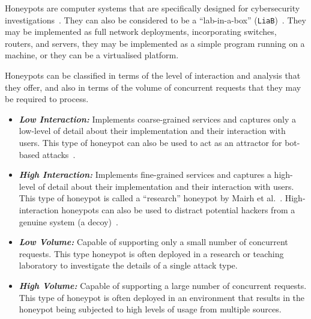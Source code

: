 \documentclass{ieeeaccess}
\begin{document}
Honeypots are computer systems that are specifically designed for cybersecurity
investigations~\cite{FKAS:17,BCF:12}. They can also be considered to be a
``lab-in-a-box'' (\texttt{LiaB})~\cite{CFDMH:09}. They may be implemented as
full network deployments, incorporating switches, routers, and servers, they
may be implemented as a simple program running on a machine, or they can be a
virtualised platform. 

Honeypots can be classified in terms of the level of interaction and
analysis that they offer, and also in terms of the volume of concurrent requests
that they may be required to process.

\begin{itemize}

  \item \noindent \emph{\textbf{Low Interaction:}} Implements coarse-grained
    services and captures only a low-level of detail about their implementation
    and their interaction with users.  This type of honeypot can also be used
    to act as an attractor for bot-based attacks~\cite{SZB:16}.  

  \item \noindent \emph{\textbf{High Interaction:}} Implements fine-grained
    services and captures a high-level of detail about their implementation and
    their interaction with users.  This type of honeypot is called a
    ``research'' honeypot by Mairh et al.~\cite{MBVJ:11}. High-interaction
    honeypots can also be used to distract potential hackers from a genuine
    system (a decoy)~\cite{M:06,SNKA:12}.

\end{itemize}


\begin{itemize}

  \item \noindent \emph{\textbf{Low Volume:}} Capable of supporting only a
    small number of concurrent requests.  This type honeypot is often deployed
    in a research or teaching laboratory to investigate the details of a single
    attack type.

  \item \noindent \emph{\textbf{High Volume:}} Capable of supporting a large
    number of concurrent requests. This type of honeypot is often deployed in
    an environment that results in the honeypot being subjected to high levels
    of usage from multiple sources. 

\end{itemize}
\end{document}
